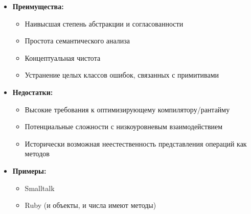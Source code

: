 \begin{itemize}[leftmargin=*, label={--}]
    \item \textbf{Преимущества:}
    \begin{itemize}
        \item Наивысшая степень абстракции и согласованности
        \item Простота семантического анализа
        \item Концептуальная чистота
        \item Устранение целых классов ошибок, связанных с примитивами
    \end{itemize}

    \item \textbf{Недостатки:}
    \begin{itemize}
        \item Высокие требования к оптимизирующему компилятору/рантайму
        \item Потенциальные сложности с низкоуровневым взаимодействием
        \item Исторически возможная неестественность представления операций как методов
    \end{itemize}

    \item \textbf{Примеры:}
    \begin{itemize}
        \item Smalltalk
        \item Ruby (и объекты, и числа имеют методы)
    \end{itemize}
\end{itemize}

\newpage